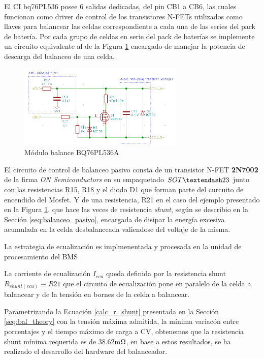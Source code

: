\documentclass[10pt, a4paper]{report}
\begin{document}
El \acrshort{CI} bq76PL536 posee 6 salidas dedicadas, del pin CB1 a CB6, las
cuales funcionan como driver de control de los transistores N-FETs utilizados
como llaves para balancear las celdas correspondiente a cada una de las series
del pack de batería.
Por cada grupo de celdas en serie del pack de baterías se implemente un circuito
equivalente al de la Figura \ref{fig:bq76_balance_power} encargado de manejar
la potencia de descarga del balanceo de una celda.

\begin{figure}[!h]
    \begin{center}
        \includegraphics[width=0.7\textwidth]{hardware/bat_monitor/bat_mon_balance.png}
        \caption{Módulo balance BQ76PL536A}
        \label{fig:bq76_balance_power}
    \end{center}
\end{figure}

El circuito de control de balanceo pasivo consta de un transistor N-FET
\textbf{2N7002} de la firma \emph{ON Semiconductors} en su empaquetado $SOT\textendash23$
junto con las resistencias R15, R18 y el diodo D1 que forman parte del curcuito
de encendido del Mosfet. Y de una resistencia, R21 en el caso del ejemplo
presentado en la Figura \ref{fig:bq76_balance_power}, que hace las veces de
resistencia \emph{shunt}, según se describio en la Sección
\ref{seq:balanceo_pasivo}, encargada de disipar la energía excesiva acumulada en
la celda desbalanceada valiendose del voltaje de la misma. 

La estrategia de ecualización es implmenentada y procesada en la unidad de
procesamiento del \acrshort{BMS}

La corriente de ecualización $I_{ecu}$ queda definida por la resistencia shunt
$R_{shunt(ecu)} \equiv R21$ que el circuito de ecualización pone en paralelo de
la celda a balancear y de la tensión en bornes de la celda a balancear. 

Parametrizando la Ecuaci\'on \ref{calc_r_shunt} presentada en la Sección 
\ref{seq:bal_theory} con la tensi\'on m\'axima admitida, la m\'inima variac\'on 
entre porcentajes y el tiempo m\'aximo de carga a \acrshort{CV}, obtenemos que 
la resistencia shunt m\'inima requerida es de 38.62m$\mathrm{\ohm}$, en base a
estos resultados, se ha realizado el desarrollo del hardware del balanceador.
\end{document}
